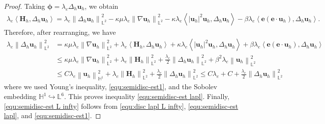 \documentclass[11pt, reqno]{amsart}
\theoremstyle{definition}
\theoremstyle{remark}
\numberwithin{equation}{section}
\newcommand{\bff}{\boldsymbol}
\newcommand{\bb}{\mathbb}
\newcommand{\norm}[2]{\left\|{#1}\right\|_{#2}}
\newcommand{\inpro}[2]{\left\langle#1,#2\right\rangle}
\begin{document}
\begin{proof}
Taking $\bff{\phi}= \lambda_e \Delta_h \bff{u}_h$, we obtain
\begin{align*}
	\lambda_e \inpro{\bff{H}_h}{\Delta_h \bff{u}_h}
	=
	\lambda_e \norm{\Delta_h \bff{u}_h}{\bb{L}^2}^2
	-
	\kappa\mu \lambda_e \norm{\nabla \bff{u}_h}{\bb{L}^2}^2
	-
	\kappa \lambda_e \inpro{|\bff{u}_h|^2 \bff{u}_h}{\Delta_h \bff{u}_h}
	-
	\beta \lambda_e \inpro{\bff{e}(\bff{e}\cdot \bff{u}_h)}{\Delta_h \bff{u}_h}.
\end{align*}
Therefore, after rearranging, we have
\begin{align*}
	\lambda_e \norm{\Delta_h \bff{u}_h}{\bb{L}^2}^2
	&=
	\kappa\mu \lambda_e \norm{\nabla \bff{u}_h}{\bb{L}^2}^2
	+
	\lambda_e \inpro{\bff{H}_h}{\Delta_h \bff{u}_h}
	+
	\kappa \lambda_e \inpro{|\bff{u}_h|^2 \bff{u}_h}{\Delta_h \bff{u}_h}
	+
	\beta \lambda_e \inpro{\bff{e}(\bff{e}\cdot \bff{u}_h)}{\Delta_h \bff{u}_h}
	\\
	&\leq
	\kappa \mu \lambda_e \norm{\nabla \bff{u}_h}{\bb{L}^2}^2
	+
	\lambda_e \norm{\bff{H}_h}{\bb{L}^2}^2
	+
	\frac{\lambda_e}{2} \norm{\Delta_h \bff{u}_h}{\bb{L}^2}^2
	+
	\beta^2 \lambda_e  \norm{\bff{u}_h}{\bb{L}^2}^2
	\\
	&\leq
	C \lambda_e \norm{\bff{u}_h}{\bb{H}^1}^2 
	+ 
	\lambda_e \norm{\bff{H}_h}{\bb{L}^2}^2
	+
	\frac{\lambda_e}{2}  \norm{\Delta_h \bff{u}_h}{\bb{L}^2}^2
	\leq 
	C\lambda_e + C + \frac{\lambda_e}{2}  \norm{\Delta_h \bff{u}_h}{\bb{L}^2}^2
\end{align*}
where we used Young's inequality, \eqref{equ:semidisc-est1}, and the Sobolev embedding $\bb{H}^1\hookrightarrow \bb{L}^6$. This proves inequality \eqref{equ:semidisc-est lapl}.
Finally, \eqref{equ:semidisc-est L infty} follows from \eqref{equ:disc lapl L infty}, \eqref{equ:semidisc-est lapl}, and \eqref{equ:semidisc-est1}.
\end{proof}
\end{document}
